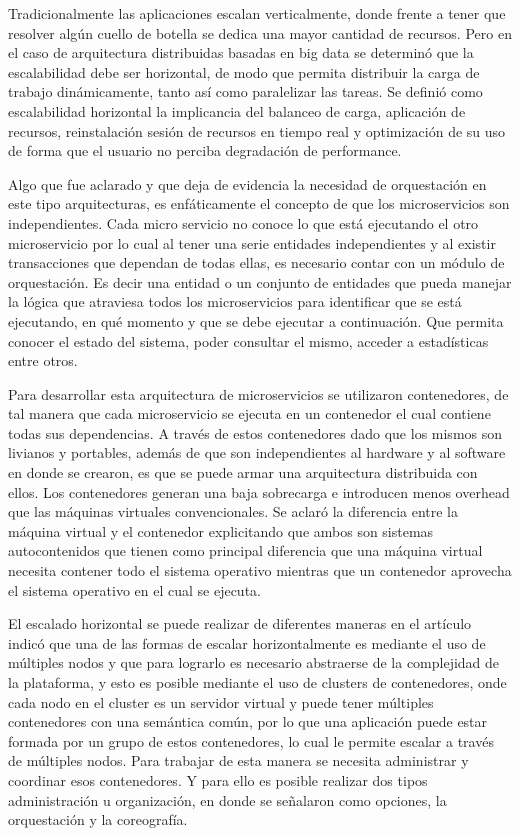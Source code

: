 Tradicionalmente las aplicaciones escalan verticalmente, donde frente a tener que resolver algún cuello de botella se dedica una mayor cantidad de recursos.
Pero en el caso de arquitectura distribuidas basadas en big data se determinó que la escalabilidad debe ser horizontal, de modo que permita distribuir la carga de trabajo dinámicamente, tanto así como paralelizar las tareas.
Se definió como escalabilidad horizontal la implicancia del balanceo de carga, aplicación de recursos, reinstalación sesión de recursos en tiempo real y optimización de su uso de forma que el usuario no perciba degradación de performance.\par

Algo que fue aclarado y que deja de evidencia la necesidad de orquestación en este tipo arquitecturas, es enfáticamente el concepto de que los microservicios son independientes.
Cada micro servicio no conoce lo que está ejecutando el otro microservicio por lo cual al tener una serie entidades independientes y al existir transacciones que dependan de todas ellas, es necesario contar con un módulo de orquestación.
Es decir una entidad o un conjunto de entidades que pueda manejar la lógica que atraviesa todos los microservicios para identificar que se está ejecutando, en qué momento y que se debe ejecutar a continuación.
Que permita conocer el estado del sistema, poder consultar el mismo, acceder a estadísticas entre otros.\par

Para desarrollar esta arquitectura de microservicios se utilizaron contenedores, de tal manera que cada microservicio se ejecuta en un contenedor el cual contiene todas sus dependencias.
A través de estos contenedores dado que los mismos son livianos y portables, además de que son independientes al hardware y al software en donde se crearon, es que se puede armar una arquitectura distribuida con ellos.
Los contenedores generan una baja sobrecarga e introducen menos overhead que las máquinas virtuales convencionales.
Se aclaró la diferencia entre la máquina virtual y el contenedor explicitando que ambos son sistemas autocontenidos que tienen como principal diferencia que una máquina virtual necesita contener todo el sistema operativo mientras que un contenedor aprovecha el sistema operativo en el cual se ejecuta.\par

El escalado horizontal se puede realizar de diferentes maneras en el artículo indicó que una de las formas de escalar horizontalmente es mediante el uso de múltiples nodos y que para lograrlo es necesario abstraerse de la complejidad de la plataforma, y esto es posible mediante el uso de clusters de contenedores, onde cada nodo en el cluster es un servidor virtual y puede tener múltiples contenedores con una semántica común,
por lo que una aplicación puede estar formada por un grupo de estos contenedores, lo cual le permite escalar a través de múltiples nodos.
Para trabajar de esta manera se necesita administrar y coordinar esos contenedores.
Y para ello es posible realizar dos tipos administración u organización, en donde se señalaron como opciones, la orquestación y la coreografía.\par

